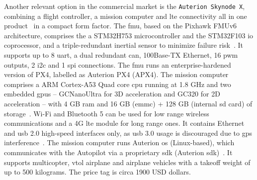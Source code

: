 Another relevant option in the commercial market is the \lstinline{Auterion Skynode X},
combining a flight controller, a mission computer and \gls{lte} connectivity all
in one product~\cite{skynodeXWebsite} in a compact form factor.
%
The \gls{fmu}, based on the Pixhawk FMUv6 architecture, comprises the 
a STM32H753 microcontroller and the STM32F103 \gls{io} coprocessor, and a
triple-redundant inertial sensor to minimize failure risk~\cite{skynodeXDatasheet}.
It supports up to 8 \gls{uart}, a dual redundant \gls{can},
100Base-TX Ethernet, 16 \gls{pwm} outputs, 2 \gls{i2c} and 1 \gls{spi}
connections. The \gls{fmu} runs an enterprise-hardened version of PX4, labelled
as Auterion PX4 (APX4)\cite{skynodeXDatasheet}.
%
%
The mission computer comprises a ARM Cortex-A53 Quad core \gls{cpu} running at
1.8 GHz and two embedded \glspl{gpu} -- GCNanoUltra for 3D acceleration and GC320 for
2D acceleration -- with 4 GB \gls{ram} and 16 GB (\gls{emmc}) + 128 GB (internal
\gls{sd} card) of storage~\cite{skynodeXDatasheet}. Wi-Fi and Bluetooth 5 can be used for low range
wireless communications and a 4G \gls{lte} module for long range ones. It
contains Ethernet and \gls{usb} 2.0 high-speed interfaces only, as \gls{usb} 3.0 usage is discouraged
due to \gls{gps} interference~\cite{skynodeXDatasheet}.
The mission computer runs Auterion
\gls{os} (Linux-based), which communicates with the Autopilot via a proprietary
\gls{sdk} (Auterion \gls{sdk})~\cite{skynodeX-px4}.
%
It supports multicopter, \gls{vtol} airplane and airplane vehicles with a
takeoff weight of up to 500 kilograms. The price tag is circa 1900 USD
dollars\cite{skynodePrice}.

